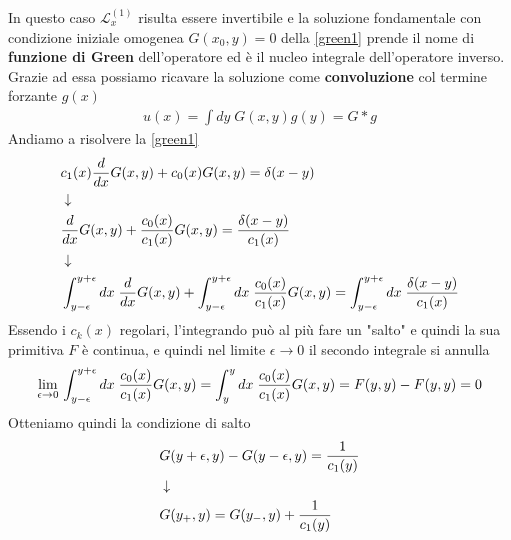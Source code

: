 In questo caso $\mathcal{L}^{(1)}_x$ risulta essere invertibile e la soluzione fondamentale con condizione iniziale omogenea $G(x_0,y) = 0$ della \ref{green1} prende il nome di \textbf{funzione di Green} dell'operatore ed è il nucleo integrale dell'operatore inverso. Grazie ad essa possiamo ricavare la soluzione come \textbf{convoluzione} col termine forzante $g(x)$
\begin{align}
	u(x) = \int dy \; G(x,y) g(y) = G * g
\end{align}
Andiamo a risolvere la \ref{green1}
\begin{align}
	&c_1 (x) \frac{d}{dx}G(x,y) + c_0(x) G(x,y)  = \delta(x-y) \\ &\downarrow \nonumber \\
	&\frac{d}{dx}G(x,y) + \frac{c_0(x)}{c_1(x)} G(x,y)  = \frac{\delta(x-y)}{c_1(x)}\\ &\downarrow \nonumber \\
	&\int_{y-\epsilon}^{y+\epsilon} dx \;\frac{d}{dx}G(x,y) + \int_{y-\epsilon}^{y+\epsilon} dx \;\frac{c_0(x)}{c_1(x)} G(x,y)  = \int_{y-\epsilon}^{y+\epsilon} dx \;\frac{\delta(x-y)}{c_1(x)}
\end{align}
Essendo i $c_k(x)$ regolari, l'integrando può al più fare un "salto" e quindi la sua primitiva $F$ è continua, e quindi nel limite $\epsilon \to 0$ il secondo integrale si annulla
\begin{align}
\underset{\epsilon \rightarrow 0}{\lim} \,\int_{y-\epsilon}^{y+\epsilon} dx \;\frac{c_0(x)}{c_1(x)} G(x,y)  = \int_{y}^{y} dx \;\frac{c_0(x)}{c_1(x)} G(x,y) = F(y,y) - F(y,y) = 0
\end{align}
Otteniamo quindi la condizione di salto
\begin{align}
&G(y+\epsilon,y) - G(y-\epsilon,y) = \frac{1}{c_1(y)}\\ &\downarrow \nonumber \\
&G(y_+,y) = G(y_-,y) + \frac{1}{c_1(y)}
\end{align}

